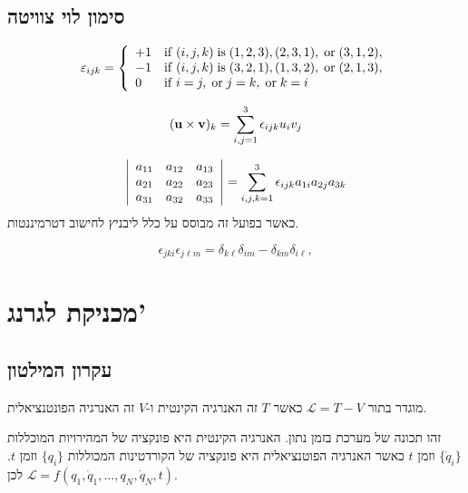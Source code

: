 \documentclass{tstextbook}
\begin{document}
\subsection{סימון לוי צוויטה}

\begin{definition}
$$\varepsilon_{i j k}={\left\{\begin{array}{l l}{+1}&{{\mathrm{if}}\;(i,j,k)\;{\mathrm{is}}\;(1,2,3),(2,3,1),\;{\mathrm{or}}\;(3,1,2),}\\ {-1}&{{\mathrm{if}}\;(i,j,k)\;{\mathrm{is}}\;(3,2,1),(1,3,2),\;{\mathrm{or}}\;(2,1,3),}\\ {0}&{{\mathrm{if}}\;i=j,\;{\mathrm{or}}\;j=k,\;{\mathrm{or}}\;k=i}\end{array}\right.}$$

\end{definition}
\begin{proposition}
$$({\bf u}\times{\bf v})_{k}=\sum_{i,j=1}^{3}\epsilon_{i j k}u_{i}v_{j}$$

\end{proposition}
\begin{proposition}
$${\left|\begin{array}{l l l}{a_{11}}&{a_{12}}&{a_{13}}\\ {a_{21}}&{a_{22}}&{a_{23}}\\ {a_{31}}&{a_{32}}&{a_{33}}\end{array}\right|}=\sum_{i,j,k=1}^{3}\epsilon_{i j k}a_{1i}a_{2j}a_{3k}$$
כאשר בפועל זה מבוסס על כלל ליבניץ לחישוב דטרמיננטות.

\end{proposition}
\begin{proposition}
$$\epsilon_{j k i}\epsilon_{j\ell m}=\delta_{k\ell}\delta_{i m}-\delta_{k m}\delta_{i\ell},$$

\end{proposition}
\section{מכניקת לגרנג'}

\subsection{עקרון המילטון}

\begin{definition}
מוגדר בתור \(\mathcal{L} =T-V\) כאשר \(T\) זה האנרגיה הקינטית ו-\(V\) זה האנרגיה הפונטנציאלית.

\end{definition}
זהו תכונה של מערכת בזמן נתון. האנרגיה הקינטית היא פונקציה של המהירויות המוכללות \(\{ \dot{q}_{i} \}\) וזמן \(t\) כאשר האנרגיה הפוטנציאלית היא פונקציה של הקורדטינות המכוללות \(\{ q_{i} \}\) וזמן \(t\). לכן \(\mathcal{L} =f\left( q_1,\dot{q}_{1},\dots,q_{N},\dot{q}_{N},t \right)\).
\end{document}
